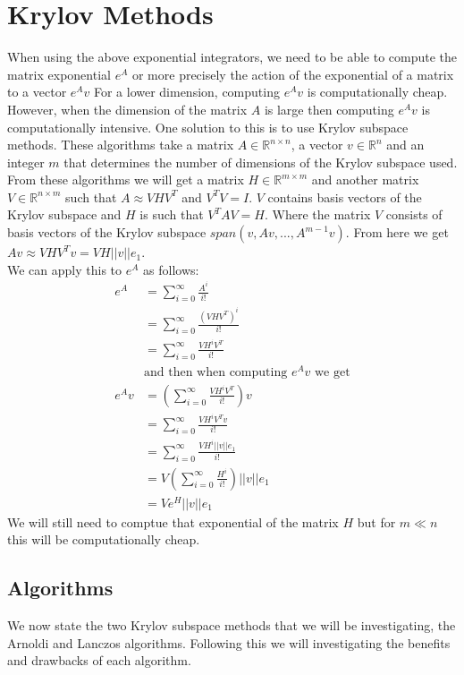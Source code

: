 \section{Krylov Methods}
When using the above exponential integrators, we need to be able to compute the matrix exponential $e^{A}$ or more precisely the action of the exponential of a matrix to a vector $e^{A}v$
For a lower dimension, computing $e^{A}v$ is computationally cheap.
However, when the dimension of the matrix $A$ is large then computing $e^{A}v$ is computationally intensive.
One solution to this is to use Krylov subspace methods.
These algorithms take a matrix $A\in \mathbb{R}^{n\times n}$, a vector $v \in \mathbb{R}^n$ and an integer $m$ that determines the number of dimensions of the Krylov subspace used.
From these algorithms we will get a matrix $H \in \mathbb{R}^{m\times m}$ and another matrix $V \in \mathbb{R}^{n\times m}$ such that $A \approx VHV^T$ and $V^TV = I$.
$V$ contains basis vectors of the Krylov subspace and $H$ is such that $V^TAV = H$.
Where the matrix $V$ consists of basis vectors of the Krylov subspace $span(v, Av, ..., A^{m-1}v)$.
From here we get $Av \approx VHV^Tv = VH||v||e_1$.\\
We can apply this to $e^A$ as follows:
\begin{align*}
e^A &= \sum^{\infty}_{i=0}\frac{A^i}{i!}\\
&= \sum^{\infty}_{i=0}\frac{(VHV^T)^i}{i!} \\
&= \sum^{\infty}_{i=0}\frac{VH^iV^T}{i!} \\
&\text {and then when computing $e^Av$ we get}\\
e^Av &= (\sum^{\infty}_{i=0}\frac{VH^iV^T}{i!})v \\
&= \sum^{\infty}_{i=0}\frac{VH^iV^Tv}{i!} \\
&= \sum^{\infty}_{i=0}\frac{VH^i||v||e_1}{i!} \\
&= V(\sum^{\infty}_{i=0}\frac{H^i}{i!})||v||e_1 \\
&= Ve^H||v||e_1
\end{align*}
We will still need to comptue that exponential of the matrix $H$ but for $m\ll n$ this will be computationally cheap.

\subsection{Algorithms}
We now state the two Krylov subspace methods that we will be investigating, the Arnoldi and Lanczos algorithms.
Following this we will investigating the benefits and drawbacks of each algorithm.

